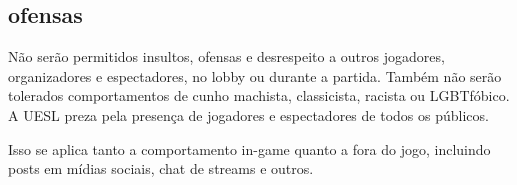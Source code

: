 \subsection{ofensas}

Não serão permitidos insultos, ofensas e desrespeito a outros jogadores, organizadores e espectadores, no lobby ou durante a partida. Também não serão tolerados comportamentos de cunho machista, classicista, racista ou LGBTfóbico. A UESL preza pela presença de jogadores e espectadores de todos os públicos.

Isso se aplica tanto a comportamento in-game quanto a fora do jogo, incluindo posts em mídias sociais, chat de streams e outros.
